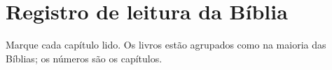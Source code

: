 \chapter{Registro de leitura da Bíblia}

Marque cada capítulo lido. Os livros estão agrupados como na maioria das
Bíblias; os números são os capítulos.

\leituradabiblia
